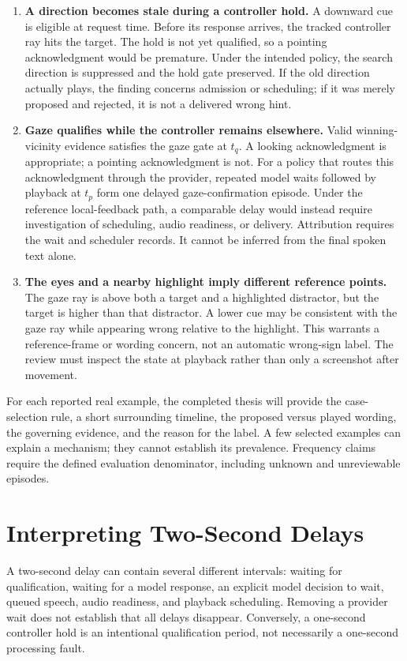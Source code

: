 \begin{enumerate}
\item \textbf{A direction becomes stale during a controller hold.} A downward cue is eligible at request time. Before its response arrives, the tracked controller ray hits the target. The hold is not yet qualified, so a pointing acknowledgment would be premature. Under the intended policy, the search direction is suppressed and the hold gate preserved. If the old direction actually plays, the finding concerns admission or scheduling; if it was merely proposed and rejected, it is not a delivered wrong hint.
\item \textbf{Gaze qualifies while the controller remains elsewhere.} Valid winning-vicinity evidence satisfies the gaze gate at $t_q$. A looking acknowledgment is appropriate; a pointing acknowledgment is not. For a policy that routes this acknowledgment through the provider, repeated model waits followed by playback at $t_p$ form one delayed gaze-confirmation episode. Under the reference local-feedback path, a comparable delay would instead require investigation of scheduling, audio readiness, or delivery. Attribution requires the wait and scheduler records. It cannot be inferred from the final spoken text alone.
\item \textbf{The eyes and a nearby highlight imply different reference points.} The gaze ray is above both a target and a highlighted distractor, but the target is higher than that distractor. A lower cue may be consistent with the gaze ray while appearing wrong relative to the highlight. This warrants a reference-frame or wording concern, not an automatic wrong-sign label. The review must inspect the state at playback rather than only a screenshot after movement.
\end{enumerate}

For each reported real example, the completed thesis will provide the case-selection rule, a short surrounding timeline, the proposed versus played wording, the governing evidence, and the reason for the label. A few selected examples can explain a mechanism; they cannot establish its prevalence. Frequency claims require the defined evaluation denominator, including unknown and unreviewable episodes.

\section{Interpreting Two-Second Delays}
A two-second delay can contain several different intervals: waiting for qualification, waiting for a model response, an explicit model decision to wait, queued speech, audio readiness, and playback scheduling. Removing a provider wait does not establish that all delays disappear. Conversely, a one-second controller hold is an intentional qualification period, not necessarily a one-second processing fault.

